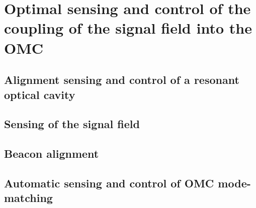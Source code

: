 \chapter{Optimal sensing and control of the coupling of the signal field into the OMC}

\section{Alignment sensing and control of a resonant optical cavity}

\section{Sensing of the signal field}

\section{Beacon alignment}

\section{Automatic sensing and control of OMC mode-matching}

